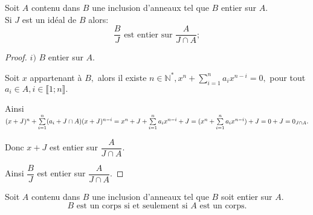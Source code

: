 \begin{maproposition}
	Soit $A $ contenu dans $ B$ une inclusion d'anneaux tel que $B$ entier sur $A$.\\
		Si $J$ est un idéal de $B$ alors:
		\[ \dfrac{B}{J} \text{  est entier sur } \dfrac{A}{J \cap A};\]

\end{maproposition}

\begin{proof}
	$i)$ $B$ entier sur $A.$ 
	
	Soit $x$ appartenant à $ B,$ alors il existe $n\in \mathbb{N}^{\ast },x^{n}+\sum\limits_{i=1}^{n}a_{i}x^{n-i}=0,$ pour tout $a_{i}\in	A,i\in \llbracket 1; n \rrbracket.$
	
	Ainsi $(x+J)^{n}+\sum\limits_{i=1}^{n}(a_{i}+J\cap
	A)(x+J)^{n-i}=x^{n}+J+\sum\limits_{i=1}^{n}a_{i}x^{n-i}+J=\\
	(x^{n}+\sum\limits_{i=1}^{n}a_{i}x^{n-i})+J=0+J=0_{J\cap A}.$
	
	Donc $x+J$ est entier sur $\dfrac{A}{J\cap A}.$
	
	Ainsi $\dfrac{B}{J}$ est entier sur $\dfrac{A}{J\cap A}.$
	
	
	
%	
%	
%	
%	
%	
\end{proof}
\begin{maproposition}
	Soit $A $ contenu dans $ B$ une inclusion d'anneaux tel que $B$ soit entier sur $A$.
	\[ B \text{ est un corps} \text{ si et seulement si }  A \text{ est un corps}.\]
\end{maproposition}

